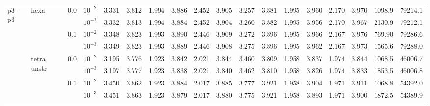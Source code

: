 \begin{longtable}{llclrrrrrrrrrrrrrr}
\multirow{8}{*}{p3--p3} & \multirow{4}{*}{hexa} & \multirow{2}{*}{0.0} & $10^{-2}$ & 3.331 & 3.812 & 1.994 & 3.886 & 2.452 & 3.905 & 3.257 & 3.881 & 1.995 & 3.960 & 2.170 & 3.970 & 1098.9 & 79214.1 \\
& & & $10^{-3}$ & 3.332 & 3.813 & 1.994 & 3.884 & 2.452 & 3.904 & 3.260 & 3.882 & 1.995 & 3.956 & 2.170 & 3.967 & 2130.9 & 79212.1 \\\cline{3-18}
& & \multirow{2}{*}{0.1} & $10^{-2}$ & 3.348 & 3.823 & 1.993 & 3.890 & 2.446 & 3.909 & 3.272 & 3.896 & 1.995 & 3.966 & 2.167 & 3.976 & 769.90 & 79286.6 \\
& & & $10^{-3}$ & 3.349 & 3.823 & 1.993 & 3.889 & 2.446 & 3.908 & 3.275 & 3.896 & 1.995 & 3.962 & 2.167 & 3.973 & 1565.6 & 79288.0 \\\cline{2-18}
& \multirow{4}{*}{tetra unstr} & \multirow{2}{*}{0.0} & $10^{-2}$ & 3.195 & 3.776 & 1.923 & 3.842 & 2.021 & 3.844 & 3.460 & 3.809 & 1.958 & 3.837 & 1.974 & 3.844 & 1068.5 & 46006.7 \\
& & & $10^{-3}$ & 3.197 & 3.777 & 1.923 & 3.838 & 2.021 & 3.840 & 3.462 & 3.810 & 1.958 & 3.826 & 1.974 & 3.833 & 1853.5 & 46006.8 \\\cline{3-18}
& & \multirow{2}{*}{0.1} & $10^{-2}$ & 3.450 & 3.862 & 1.923 & 3.884 & 2.017 & 3.885 & 3.777 & 3.921 & 1.958 & 3.904 & 1.971 & 3.911 & 1068.8 & 54392.0 \\
& & & $10^{-3}$ & 3.451 & 3.863 & 1.923 & 3.879 & 2.017 & 3.880 & 3.775 & 3.921 & 1.958 & 3.893 & 1.971 & 3.900 & 1872.5 & 54389.9 \\\hline

\bottomrule
\end{longtable}
\normalsize
